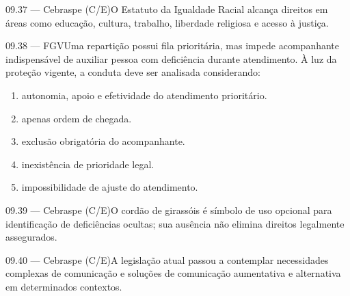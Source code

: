 \begin{questao}{ 09.37 — Cebraspe (C/E)}O Estatuto da Igualdade Racial alcança direitos em áreas como educação, cultura, trabalho, liberdade religiosa e acesso à justiça.\end{questao}
\begin{questao}{ 09.38 — FGV}Uma repartição possui fila prioritária, mas impede acompanhante indispensável de auxiliar pessoa com deficiência durante atendimento. À luz da proteção vigente, a conduta deve ser analisada considerando:\begin{enumerate}[label=\Alph*)]\item autonomia, apoio e efetividade do atendimento prioritário.\item apenas ordem de chegada.\item exclusão obrigatória do acompanhante.\item inexistência de prioridade legal.\item impossibilidade de ajuste do atendimento.\end{enumerate}\end{questao}
\begin{questao}{ 09.39 — Cebraspe (C/E)}O cordão de girassóis é símbolo de uso opcional para identificação de deficiências ocultas; sua ausência não elimina direitos legalmente assegurados.\end{questao}
\begin{questao}{ 09.40 — Cebraspe (C/E)}A legislação atual passou a contemplar necessidades complexas de comunicação e soluções de comunicação aumentativa e alternativa em determinados contextos.\end{questao}

